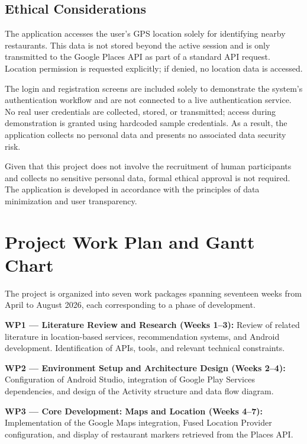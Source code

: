\documentclass[12pt, a4paper]{article}
\begin{document}
\subsection{Ethical Considerations}

The application accesses the user's GPS location solely for identifying nearby restaurants. This data is not stored beyond the active session and is only transmitted to the Google Places API as part of a standard API request. Location permission is requested explicitly; if denied, no location data is accessed.

The login and registration screens are included solely to demonstrate the system's authentication workflow and are not connected to a live authentication service. No real user credentials are collected, stored, or transmitted; access during demonstration is granted using hardcoded sample credentials. As a result, the application collects no personal data and presents no associated data security risk.

Given that this project does not involve the recruitment of human participants and collects no sensitive personal data, formal ethical approval is not required. The application is developed in accordance with the principles of data minimization and user transparency.

\section{Project Work Plan and Gantt Chart}

The project is organized into seven work packages spanning seventeen weeks from April to August 2026, each corresponding to a phase of development.

\textbf{WP1 — Literature Review and Research (Weeks 1–3):} Review of related literature in location-based services, recommendation systems, and Android development. Identification of APIs, tools, and relevant technical constraints.

\textbf{WP2 — Environment Setup and Architecture Design (Weeks 2–4):} Configuration of Android Studio, integration of Google Play Services dependencies, and design of the Activity structure and data flow diagram.

\textbf{WP3 — Core Development: Maps and Location (Weeks 4–7):} Implementation of the Google Maps integration, Fused Location Provider configuration, and display of restaurant markers retrieved from the Places API.
\end{document}
